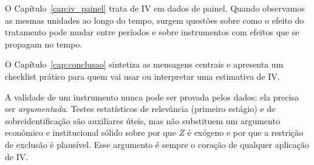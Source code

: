 O Capítulo~\ref{cap:iv_painel} trata de IV em dados de painel. Quando observamos as mesmas unidades ao longo do tempo, surgem questões sobre como o efeito do tratamento pode mudar entre períodos e sobre instrumentos com efeitos que se propagam no tempo.

O Capítulo~\ref{cap:conclusao} sintetiza as mensagens centrais e apresenta um checklist prático para quem vai usar ou interpretar uma estimativa de IV.

\begin{notabox}
A validade de um instrumento nunca pode ser provada pelos dados: ela precisa ser \textit{argumentada}. Testes estatísticos de relevância (primeiro estágio) e de sobreidentificação são auxiliares úteis, mas não substituem um argumento econômico e institucional sólido sobre por que $Z$ é exógeno e por que a restrição de exclusão é plausível. Esse argumento é sempre o coração de qualquer aplicação de IV.
\end{notabox}

